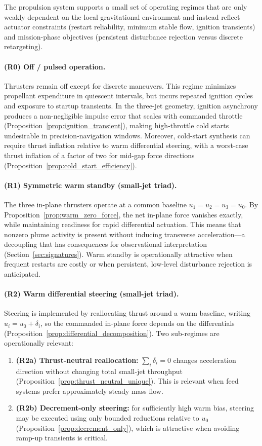 \documentclass{article}
\begin{document}
The propulsion system supports a small set of operating regimes that are only weakly dependent on the local gravitational environment and instead reflect actuator constraints (restart reliability, minimum stable flow, ignition transients) and mission-phase objectives (persistent disturbance rejection versus discrete retargeting).


\paragraph{(R0) Off / pulsed operation.}
Thrusters remain off except for discrete maneuvers. This regime minimizes propellant expenditure in quiescent intervals, but incurs repeated ignition cycles and exposure to startup transients. In the three-jet geometry, ignition asynchrony produces a non-negligible impulse error that scales with commanded throttle (Proposition~\ref{prop:ignition_transient}), making high-throttle cold starts undesirable in precision-navigation windows. Moreover, cold-start synthesis can require thrust inflation relative to warm differential steering, with a worst-case thrust inflation of a factor of two for mid-gap force directions (Proposition~\ref{prop:cold_start_efficiency}).


\paragraph{(R1) Symmetric warm standby (small-jet triad).}
The three in-plane thrusters operate at a common baseline $u_1=u_2=u_3=u_0$. By Proposition~\ref{prop:warm_zero_force}, the net in-plane force vanishes exactly, while maintaining readiness for rapid differential actuation. This means that nonzero plume activity is present without inducing transverse acceleration---a decoupling that has consequences for observational interpretation (Section~\ref{sec:signatures}). Warm standby is operationally attractive when frequent restarts are costly or when persistent, low-level disturbance rejection is anticipated.

\paragraph{(R2) Warm differential steering (small-jet triad).}
Steering is implemented by reallocating thrust around a warm baseline, writing $u_i=u_0+\delta_i$, so the commanded in-plane force depends on the differentials (Proposition~\ref{prop:differential_decomposition}). Two sub-regimes are operationally relevant:
\begin{enumerate}
    \item \textbf{(R2a) Thrust-neutral reallocation:} $\sum_i \delta_i=0$ changes acceleration direction without changing total small-jet throughput (Proposition~\ref{prop:thrust_neutral_unique}). This is relevant when feed systems prefer approximately steady mass flow.
    \item \textbf{(R2b) Decrement-only steering:} for sufficiently high warm bias, steering may be executed using only bounded reductions relative to $u_0$ (Proposition~\ref{prop:decrement_only}), which is attractive when avoiding ramp-up transients is critical.
\end{enumerate}
\end{document}
